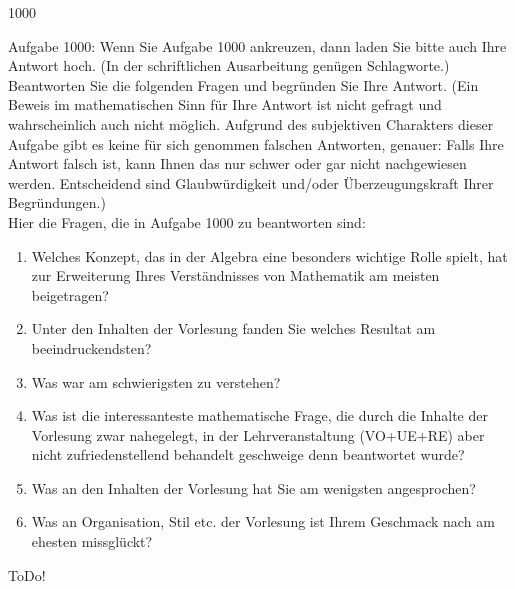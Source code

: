 \begin{algebraUE}{1000}

Aufgabe 1000: Wenn Sie Aufgabe 1000 ankreuzen, dann laden Sie bitte auch Ihre Antwort hoch. (In der schriftlichen Ausarbeitung genügen Schlagworte.) \\

Beantworten Sie die folgenden Fragen und begründen Sie Ihre Antwort. (Ein Beweis im mathematischen Sinn für Ihre Antwort ist nicht gefragt und wahrscheinlich auch nicht möglich. Aufgrund des subjektiven Charakters dieser Aufgabe gibt es keine für sich genommen falschen Antworten, genauer: Falls Ihre Antwort falsch ist, kann Ihnen das nur schwer oder gar nicht nachgewiesen werden. Entscheidend sind Glaubwürdigkeit und/oder Überzeugungskraft Ihrer Begründungen.) \\

Hier die Fragen, die in Aufgabe 1000 zu beantworten sind:

\begin{enumerate}

  \item
  Welches Konzept, das in der Algebra eine besonders wichtige Rolle spielt, hat zur Erweiterung Ihres Verständnisses von Mathematik am meisten beigetragen?

  \item
  Unter den Inhalten der Vorlesung fanden Sie welches Resultat am beeindruckendsten?

  \item
  Was war am schwierigsten zu verstehen?

  \item
  Was ist die interessanteste mathematische Frage, die durch die Inhalte der Vorlesung zwar nahegelegt, in der Lehrveranstaltung (VO+UE+RE) aber nicht zufriedenstellend behandelt geschweige denn beantwortet wurde?

  \item
  Was an den Inhalten der Vorlesung hat Sie am wenigsten angesprochen?

  \item
  Was an Organisation, Stil etc. der Vorlesung ist Ihrem Geschmack nach am ehesten missglückt?

\end{enumerate}

\end{algebraUE}

\begin{solution}

ToDo!

\end{solution}
